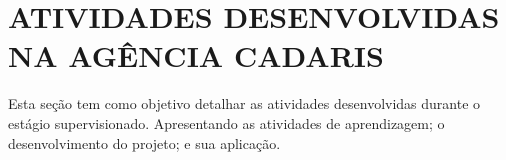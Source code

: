 \documentclass[
  12pt,				%
  openany,
  oneside,
  a4paper,			%
  english,			%
  brazil
]{article}
\numberwithin{figure}{section}
\numberwithin{table}{section}
\begin{document}
%
%
%
%
%
%


\clearpage
\section{ATIVIDADES DESENVOLVIDAS NA AGÊNCIA CADARIS}


Esta seção tem como objetivo detalhar as atividades desenvolvidas durante o estágio supervisionado. Apresentando as atividades de aprendizagem; o desenvolvimento do projeto; e sua aplicação.

\end{document}
